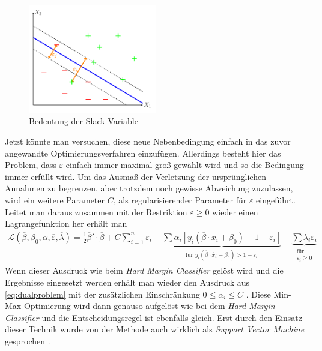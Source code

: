 \documentclass[
]{article}
\begin{document}
\begin{figure}[htb]
\centering
\includegraphics[width=0.5\textwidth,trim=0.5cm 0.5cm 0.5cm 0.5cm]{Images/slackvariable.pdf} 
        \caption{Bedeutung der Slack Variable}
        \label{fig:slackvariable}
\end{figure}

Jetzt könnte man versuchen, diese neue Nebenbedingung einfach in das
zuvor angewandte Optimierungsverfahren einzufügen. Allerdings besteht
hier das Problem, dass \(\varepsilon\) einfach immer maximal groß
gewählt wird und so die Bedingung immer erfüllt wird. Um das Ausmaß der
Verletzung der ursprünglichen Annahmen zu begrenzen, aber trotzdem noch
gewisse Abweichung zuzulassen, wird ein weitere Parameter \(C\), als
regularisierender Parameter für \(\varepsilon\) eingeführt. Leitet man
daraus zusammen mit der Restriktion \(\varepsilon\ge0\) wieder einen
Lagrangefunktion her erhält man \begin{align}
\mathcal{L}(\overline\beta,\beta_0,\overline\alpha,\overline\varepsilon,\overline\lambda)=\frac{1}{2}\overline\beta'\cdot \overline\beta + C \sum_{i=1}^{n}\varepsilon_i-\underbrace{\sum \alpha_i[y_i(\overline\beta \cdot \overline{x_i}+\beta_0)-1+\varepsilon_i]}_{\text{für }y_i(\overline\beta \cdot \overline{x}_i-\beta_0)>1- \varepsilon_i}-\underbrace{\sum \lambda_i \varepsilon_i }_{\substack{\text{für}\\ \varepsilon_i \ge 0}}
\end{align} Wenn dieser Ausdruck wie beim
\textit{Hard Margin Classifier} gelöst wird und die Ergebnisse
eingesetzt werden erhält man wieder den Ausdruck aus
\eqref{eq:dualproblem} mit der zusätzlichen Einschränkung
\(0\le \alpha_i \le C\) \parencite{bennettSupportVectorMachines2000}.
Diese Min-Max-Optimierung wird dann genauso aufgelöst wie bei dem
\textit{Hard Margin Classifier} und die Entscheidungsregel ist ebenfalls
gleich. Erst durch den Einsatz dieser Technik wurde von der Methode auch
wirklich als \textit{Support Vector Machine} gesprochen
\parencite{vapnikEstimationDependencesBased2006}.
\end{document}
